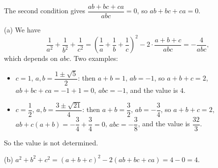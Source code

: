 The second condition gives $\dfrac{ab+bc+ca}{abc}=0$, so $ab+bc+ca=0$.

(a) We have
\[
\dfrac{1}{a^2}+\dfrac{1}{b^2}+\dfrac{1}{c^2}=\left(\dfrac{1}{a}+\dfrac{1}{b}+\dfrac{1}{c}\right)^2-2\cdot\dfrac{a+b+c}{abc}=-\dfrac{4}{abc},
\]
which depends on $abc$. Two examples:
\begin{itemize}
\item $c=1$, $a,b=\dfrac{1\pm\sqrt5}{2}$: then $a+b=1$, $ab=-1$, so $a+b+c=2$, $ab+bc+ca=-1+1=0$, $abc=-1$, and the value is $4$.
\item $c=\dfrac{1}{2}$, $a,b=\dfrac{3\pm\sqrt{21}}{4}$: then $a+b=\dfrac{3}{2}$, $ab=-\dfrac{3}{4}$, so $a+b+c=2$, $ab+c(a+b)=-\dfrac{3}{4}+\dfrac{3}{4}=0$, $abc=-\dfrac{3}{8}$, and the value is $\dfrac{32}{3}$.
\end{itemize}
So the value is not determined.

(b) $a^2+b^2+c^2=(a+b+c)^2-2(ab+bc+ca)=4-0=\boxed{4}$.
